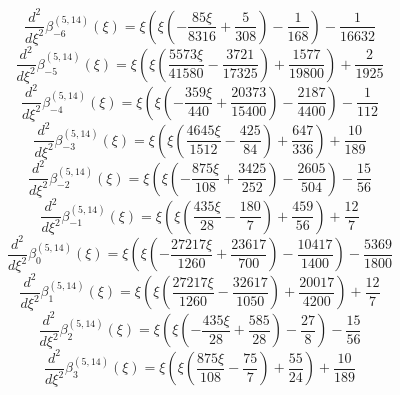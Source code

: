 
\begin{equation}
\frac{d^{2}}{d\xi^{2}}\beta_{-6}^{(5,14)} (\xi) =
 \xi \left(\xi \left(- \frac{85 \xi}{8316} + \frac{5}{308}\right) - \frac{1}{168}\right) - \frac{1}{16632}
\end{equation}
\begin{equation}
\frac{d^{2}}{d\xi^{2}}\beta_{-5}^{(5,14)} (\xi) =
 \xi \left(\xi \left(\frac{5573 \xi}{41580} - \frac{3721}{17325}\right) + \frac{1577}{19800}\right) + \frac{2}{1925}
\end{equation}
\begin{equation}
\frac{d^{2}}{d\xi^{2}}\beta_{-4}^{(5,14)} (\xi) =
 \xi \left(\xi \left(- \frac{359 \xi}{440} + \frac{20373}{15400}\right) - \frac{2187}{4400}\right) - \frac{1}{112}
\end{equation}
\begin{equation}
\frac{d^{2}}{d\xi^{2}}\beta_{-3}^{(5,14)} (\xi) =
 \xi \left(\xi \left(\frac{4645 \xi}{1512} - \frac{425}{84}\right) + \frac{647}{336}\right) + \frac{10}{189}
\end{equation}
\begin{equation}
\frac{d^{2}}{d\xi^{2}}\beta_{-2}^{(5,14)} (\xi) =
 \xi \left(\xi \left(- \frac{875 \xi}{108} + \frac{3425}{252}\right) - \frac{2605}{504}\right) - \frac{15}{56}
\end{equation}
\begin{equation}
\frac{d^{2}}{d\xi^{2}}\beta_{-1}^{(5,14)} (\xi) =
 \xi \left(\xi \left(\frac{435 \xi}{28} - \frac{180}{7}\right) + \frac{459}{56}\right) + \frac{12}{7}
\end{equation}
\begin{equation}
\frac{d^{2}}{d\xi^{2}}\beta_{0}^{(5,14)} (\xi) =
 \xi \left(\xi \left(- \frac{27217 \xi}{1260}
 + \frac{23617}{700}\right) - \frac{10417}{1400}\right) - \frac{5369}{1800}
\end{equation}
\begin{equation}
\frac{d^{2}}{d\xi^{2}}\beta_{1}^{(5,14)} (\xi) =
 \xi \left(\xi \left(\frac{27217 \xi}{1260} - \frac{32617}{1050}\right) + \frac{20017}{4200}\right) + \frac{12}{7}
\end{equation}
\begin{equation}
\frac{d^{2}}{d\xi^{2}}\beta_{2}^{(5,14)} (\xi) =
 \xi \left(\xi \left(- \frac{435 \xi}{28} + \frac{585}{28}\right) - \frac{27}{8}\right) - \frac{15}{56}
\end{equation}
\begin{equation}
\frac{d^{2}}{d\xi^{2}}\beta_{3}^{(5,14)} (\xi) =
 \xi \left(\xi \left(\frac{875 \xi}{108} - \frac{75}{7}\right) + \frac{55}{24}\right) + \frac{10}{189}
\end{equation}
